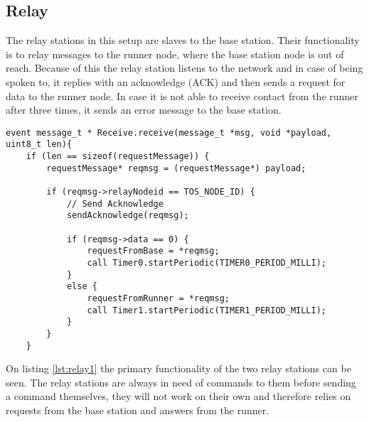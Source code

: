 \subsection{Relay}\label{sc:relay}
The relay stations in this setup are slaves to the base station. Their functionality is to relay messages to the runner node, where the base station node is out of reach. Because of this the relay station listens to the network and in case of being spoken to, it replies with an acknowledge (ACK) and then sends a request for data to the runner node. In case it is not able to receive contact from the runner after three times, it sends an error message to the base station.

\begin{minipage}[t]{0.95\linewidth}
	\begin{lstlisting}[caption=Receive message event of Relay., label={lst:relay1}]
event message_t * Receive.receive(message_t *msg, void *payload, uint8_t len){
	if (len == sizeof(requestMessage)) {
		requestMessage* reqmsg = (requestMessage*) payload;
		
		if (reqmsg->relayNodeid == TOS_NODE_ID) {
			// Send Acknowledge
			sendAcknowledge(reqmsg);
			
			if (reqmsg->data == 0) {	
				requestFromBase = *reqmsg;
				call Timer0.startPeriodic(TIMER0_PERIOD_MILLI);		
			}
			else {
				requestFromRunner = *reqmsg;
				call Timer1.startPeriodic(TIMER1_PERIOD_MILLI);
			}
		}
	}
	\end{lstlisting}
\end{minipage}

\noindent On listing \ref{lst:relay1} the primary functionality of the two relay stations can be seen. The relay stations are always in need of commands to them before sending a command themselves, they will not work on their own and therefore relies on requests from the base station and answers from the runner.
